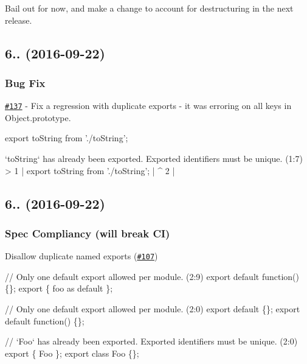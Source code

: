 Bail out for now, and make a change to account for destructuring in the next release.

\subsection*{6.. (2016-\/09-\/22)}

\subsubsection*{Bug Fix}


\begin{DoxyItemize}
\item \href{https://github.com/babel/babylon/pull/137}{\tt \#137} -\/ Fix a regression with duplicate exports -\/ it was erroring on all keys in {\ttfamily Object.\+prototype}. 
\end{DoxyItemize}


\begin{DoxyCode}
export toString from './toString';
\end{DoxyCode}



\begin{DoxyCode}
`toString` has already been exported. Exported identifiers must be unique. (1:7)
> 1 | export toString from './toString';
    |        ^
  2 |
\end{DoxyCode}


\subsection*{6.. (2016-\/09-\/22)}

\subsubsection*{Spec Compliancy (will break CI)}


\begin{DoxyItemize}
\item Disallow duplicate named exports (\href{https://github.com/babel/babylon/pull/107}{\tt \#107}) 
\end{DoxyItemize}


\begin{DoxyCode}
// Only one default export allowed per module. (2:9)
export default function() \{\};
export \{ foo as default \};

// Only one default export allowed per module. (2:0)
export default \{\};
export default function() \{\};

// `Foo` has already been exported. Exported identifiers must be unique. (2:0)
export \{ Foo \};
export class Foo \{\};
\end{DoxyCode}


